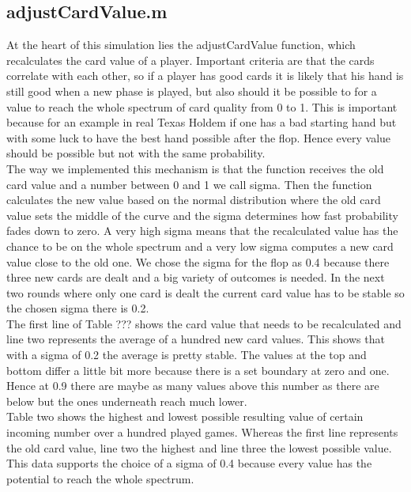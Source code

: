 \documentclass[11pt]{article}
\begin{document}
\subsection{adjustCardValue.m}
At the heart of this simulation lies the adjustCardValue function, which recalculates the card value of a player. Important criteria are that the cards correlate with each other, so if a player has good cards it is likely that his hand is still good when a new phase is played, but also should it be possible to for a value to reach the whole spectrum of card quality from 0 to 1. This is important because for an example in real Texas Holdem if one has a bad starting hand but with some luck to have the best hand possible after the flop. Hence every value should be possible but not with the same probability.\\
The way we implemented this mechanism is that the function receives the old card value and a number between 0 and 1 we call sigma. Then the function calculates the new value based on the normal distribution where the old card value sets the middle of the curve and the sigma determines how fast probability fades down to zero. A very high sigma means that the recalculated value has the chance to be on the whole spectrum and a very low sigma computes a new card value close to the old one.
We chose the sigma for the flop as 0.4 because there three new cards are dealt and a big variety of outcomes is needed. In the next two rounds where only one card is dealt the current card value has to be stable so the chosen sigma there is 0.2.\\
The first line of Table ??? shows the card value that needs to be recalculated and line two represents the average of a hundred new card values. This shows that with a sigma of 0.2 the average is pretty stable. The values at the top and bottom differ a little bit more because there is a set boundary at zero and one. Hence at 0.9 there are maybe as many values above this number as there are below but the ones underneath reach much lower.\\
Table two shows the highest and lowest possible resulting value of certain incoming number over a hundred played games. Whereas the first line represents the old card value, line two the highest and line three the lowest possible value. This data supports the choice of a sigma of 0.4 because every value has the potential to reach the whole spectrum.
\end{document}

